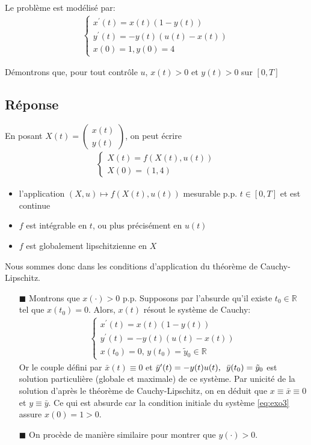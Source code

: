 \documentclass[
	french,
	11pt, %
]{fphw}
\newcommand{\hquad}{\hspace{0.5em}} %
\newcommand{\myvec}[2]{\begin{pmatrix} #1  \\ #2 \end{pmatrix}}   %
\begin{document}
\begin{problem}
Le problème est modélisé par:
\begin{align}
	\begin{cases}
		x^\prime(t) = x(t)(1-y(t)) \\
		y^\prime(t) = -y(t)(u(t)-x(t))\\
		x(0)=1, y(0)=4
	\end{cases}
	\label{eq:exo3}
\end{align}

Démontrons que, pour tout contrôle $u$, $x(t)>0$ et $y(t)>0$ sur $[0,T]$
\end{problem}

\subsection*{Réponse}
En posant $X(t)=\myvec{x(t)}{y(t)}$, on peut écrire 
\begin{align*}
	\begin{cases}
		X(t)=f(X(t),u(t)) \\
		X(0)=(1,4)
	\end{cases}
\end{align*}

\begin{itemize}
	\item l'application $(X,u)\mapsto f(X(t),u(t))$ mesurable p.p. $t\in [0,T]$ et est continue
	\item $f$ est intégrable en $t$, ou plus précisément en $u(t)$
	\item $f$ est globalement lipschitzienne en $X$
\end{itemize}
Nous sommes donc dans les conditions d'application du théorème de Cauchy-Lipschitz.

\begin{itemize}
	\item[$\blacksquare$] Montrons que $x(\cdot)>0$ p.p.
	Supposons par l'absurde qu'il existe $t_0 \in \mathbb{R}$ tel que $x(t_0)=0$. Alors, $x(t)$ résout le système de Cauchy:
	\begin{align*}
		\begin{cases}
			x^\prime(t) = x(t)(1-y(t)) \\
			y^\prime(t) = -y(t)(u(t)-x(t))\\
			x(t_0)=0,\, y(t_0)=\tilde{y}_0 \in \mathbb{R}
		\end{cases}
	\end{align*}
	Or le couple défini par $\bar{x}(t)\equiv0$ et $\bar{y}^\prime(t)=-y(t)u(t), \hquad \bar{y}(t_0)=\tilde{y}_0$ est solution particulière (globale et maximale) de ce système. Par unicité de la solution d'après le théorème de Cauchy-Lipschitz, on en déduit que $x\equiv\bar{x}\equiv 0$ et $y \equiv \bar{y}$. Ce qui est absurde car la condition initiale du système \eqref{eq:exo3} assure $x(0)=1>0$.
	\item[$\blacksquare$] On procède de manière similaire pour montrer que $y(\cdot)>0$.  
\end{itemize} 
\end{document}
